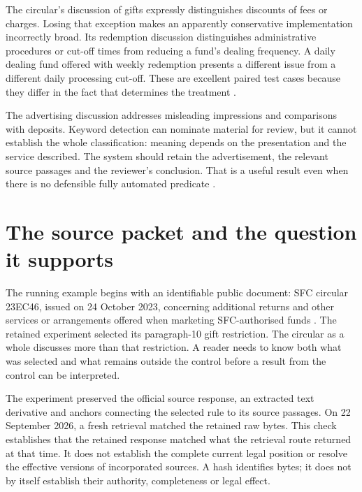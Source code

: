 \documentclass[12pt,a4paper,oneside,openany]{book}
\begin{document}
The circular's discussion of gifts expressly distinguishes discounts of fees or
charges. Losing that exception makes an apparently conservative implementation
incorrectly broad. Its redemption discussion distinguishes administrative
procedures or cut-off times from reducing a fund's dealing frequency. A daily
dealing fund offered with weekly redemption presents a different issue from a
different daily processing cut-off. These are excellent paired test cases because
they differ in the fact that determines the treatment
\citep[paras.~9--14]{sfcmarketing}.

The advertising discussion addresses misleading impressions and comparisons with
deposits. Keyword detection can nominate material for review, but it cannot
establish the whole classification: meaning depends on the presentation and the
service described. The system should retain the advertisement, the relevant
source passages and the reviewer's conclusion. That is a useful result even when
there is no defensible fully automated predicate
\citep[paras.~15--17]{sfcmarketing}.

\section{The source packet and the question it supports}
\label{merge:M02:00}

\label{sec:circular-packet}
The running example begins with an identifiable public document: SFC circular
23EC46, issued on 24 October 2023, concerning additional returns and other
services or arrangements offered when marketing SFC-authorised funds
\citep{sfcmarketing}. The retained experiment selected its paragraph-10 gift
restriction. The circular as a whole discusses more than that restriction. A
reader needs to know both what was selected and what remains outside the control
before a result from the control can be interpreted.

The experiment preserved the official source response, an extracted text
derivative and anchors connecting the selected rule to its source passages.
On 22 September 2026, a fresh retrieval matched the retained raw bytes. This
check establishes that the retained response matched what the retrieval route
returned at that time. It does not establish the complete current legal position
or resolve the effective versions of incorporated sources. A hash identifies
bytes; it does not by itself establish their authority, completeness or legal
effect.
\end{document}
